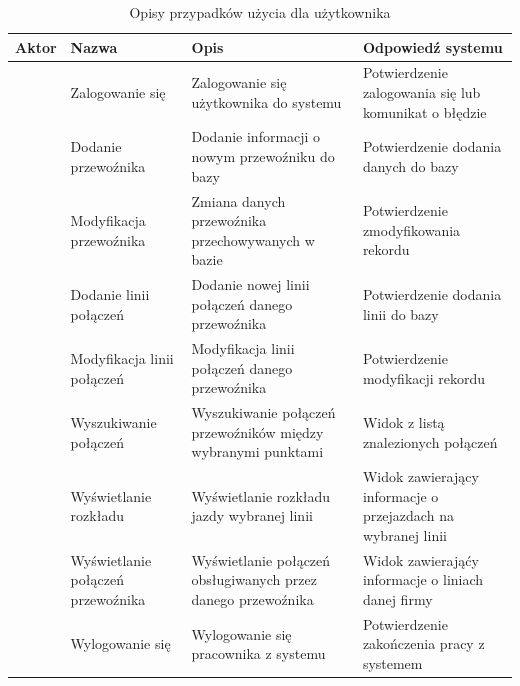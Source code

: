 \documentclass[10pt,a4paper]{article}
\begin{document}
\begin{table}[H]
	\begin{tabularx}{\textwidth}{|c|X|X|X|}
		\hline
		\textbf{Aktor} & \textbf{Nazwa} & \textbf{Opis} & \textbf{Odpowiedź systemu} \\
		\hline
		\multirow{20}{*}{\rotatebox[origin=c]{90}{Pracownik}}
		& Zalogowanie się 
		& Zalogowanie się użytkownika do systemu
		& Potwierdzenie zalogowania się lub komunikat o błędzie \\
		\cline{2-4}
		& Dodanie przewoźnika
		& Dodanie informacji o nowym przewoźniku do bazy
		& Potwierdzenie dodania danych do bazy \\
		\cline{2-4}
		& Modyfikacja przewoźnika
		& Zmiana danych przewoźnika przechowywanych w bazie
		& Potwierdzenie zmodyfikowania rekordu \\
		\cline{2-4}
		& Dodanie linii połączeń
		& Dodanie nowej linii połączeń danego przewoźnika
		& Potwierdzenie dodania linii do bazy \\
		\cline{2-4}
		& Modyfikacja linii połączeń
		& Modyfikacja linii połączeń danego przewoźnika
		& Potwierdzenie modyfikacji rekordu \\
		\cline{2-4}
		& Wyszukiwanie połączeń
		& Wyszukiwanie połączeń przewoźników między wybranymi punktami
		& Widok z listą znalezionych połączeń \\
		\cline{2-4}
		& Wyświetlanie rozkładu
		& Wyświetlanie rozkładu jazdy wybranej linii
		& Widok zawierający informacje o przejazdach na wybranej linii \\
		\cline{2-4}
		& Wyświetlanie połączeń przewoźnika
		& Wyświetlanie połączeń obsługiwanych przez danego przewoźnika
		& Widok zawierająćy informacje o liniach danej firmy \\
		\cline{2-4}
		& Wylogowanie się
		& Wylogowanie się pracownika z systemu
		& Potwierdzenie zakończenia pracy z systemem \\
		\hline
	\end{tabularx}
	\caption{Opisy przypadków użycia dla użytkownika}
\end{table}
\end{document}
